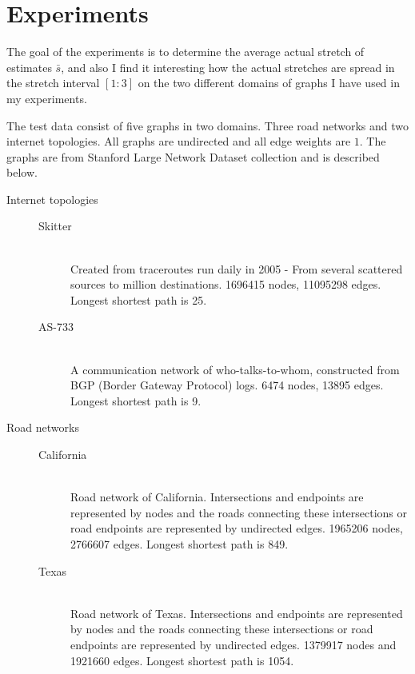 \chapter{Experiments}
\label{sec:experiments}
The goal of the experiments is to determine the average actual stretch of
estimates $\bar{s}$, and also I find it interesting how the actual stretches
are spread in the stretch interval $[1:3]$ on the two different domains of
graphs I have used in my experiments.

The test data consist of five graphs in two domains. Three road networks and
two internet topologies. All graphs are undirected and all edge weights are
$1$. The graphs are from Stanford Large Network Dataset collection\cite{snapnets} and is
described below.
\begin{description}
  \item[Internet topologies] \hfill
        \begin{description}
        \item[Skitter] \hfill \\
                Created from traceroutes run daily in 2005 - From several
                scattered sources to million destinations. 1696415 nodes,
                11095298 edges. Longest shortest path is 25.
        \item[AS-733] \hfill \\
                A communication network of who-talks-to-whom, constructed from
                BGP (Border Gateway Protocol) logs. 6474 nodes, 13895
                edges. Longest shortest path is 9.
        \end{description}
  \item[Road networks] \hfill
        \begin{description}
        \item[California] \hfill \\
                Road network of California. Intersections and endpoints
                are represented by nodes and the roads connecting these
                intersections or road endpoints are represented by undirected
                edges. 1965206 nodes, 2766607 edges. Longest shortest path is
                849.

        \item[Texas] \hfill \\
                Road network of Texas. Intersections and endpoints
                are represented by nodes and the roads connecting these
                intersections or road endpoints are represented by undirected
                edges. 1379917 nodes and 1921660 edges. Longest shortest path
                is 1054.


\end{description}
\end{description}
